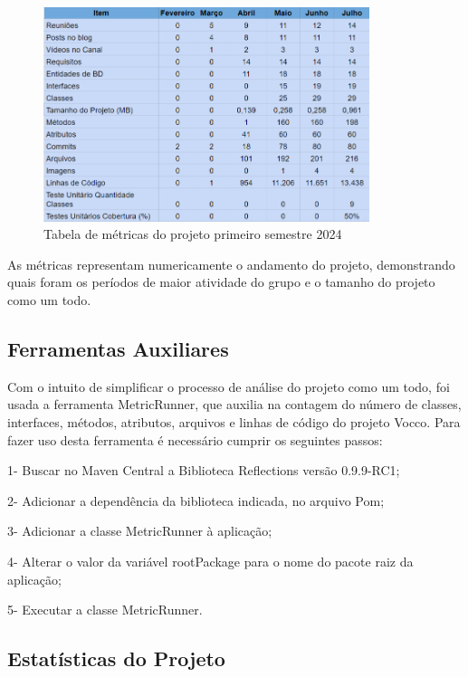 \begin{figure}[ht]
        \centering
\includegraphics[width=0.85\textwidth]{images/tabela-metricas.png}
        \caption{Tabela de métricas do projeto primeiro semestre 2024}
        \label{fig:enter-label}
    \end{figure}
As métricas representam numericamente o andamento do projeto, demonstrando quais foram os períodos de maior atividade do grupo e o tamanho do projeto como um todo.

\newpage

\subsection{Ferramentas Auxiliares}

Com o intuito de simplificar o processo de análise do projeto como um todo, foi usada a ferramenta MetricRunner, que auxilia na contagem do número de classes, interfaces, métodos, atributos, arquivos e linhas de código do projeto Vocco.
Para fazer uso desta ferramenta é necessário cumprir os seguintes passos: 

1- Buscar no Maven Central a Biblioteca Reflections versão 0.9.9-RC1;

2- Adicionar a dependência da biblioteca indicada, no arquivo Pom;

3- Adicionar a classe MetricRunner à aplicação;

4- Alterar o valor da variável rootPackage para o nome do pacote raiz da aplicação;  

5- Executar a classe MetricRunner.


\subsection{Estatísticas do Projeto}

